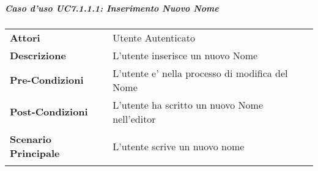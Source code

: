 \subparagraph{Caso d'uso UC7.1.1.1:  Inserimento Nuovo Nome}
\label{UC7_1_1_1}

\begin{tabular}{ l | p{11cm}}
	\hline
	\rowcolor{Gray}
	 \multicolumn{2}{c}{UC7.1.1.1 - Inserimento Nuovo Nome} \\
	 \hline
	\textbf{Attori} & Utente Autenticato \\
	\textbf{Descrizione} & L'utente inserisce un nuovo Nome\\
	\textbf{Pre-Condizioni} & L'utente e' nella processo di modifica del Nome\\
	\textbf{Post-Condizioni} & L'utente ha scritto un nuovo Nome nell'editor\\
	\textbf{Scenario Principale} & 
	\begin{enumerate*}[label=(\arabic*.),itemjoin={\newline}]
		\item L'utente scrive un nuovo nome 
	\end{enumerate*}\\
\end{tabular}